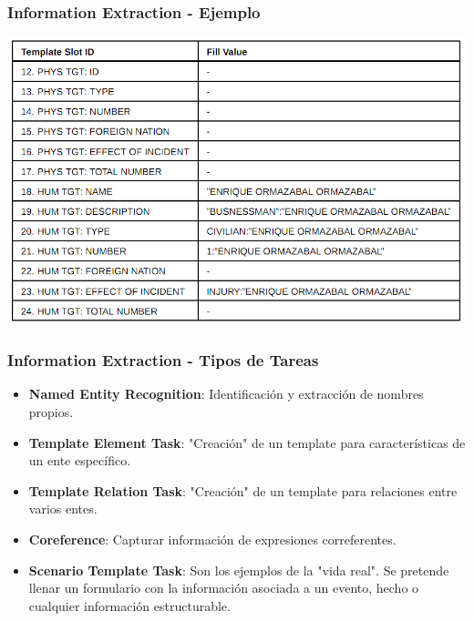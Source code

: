 \documentclass[xcolor=dvipsnames]{beamer}
\begin{document}
\begin{frame}
\frametitle{Information Extraction - Ejemplo}
\begin{center}
 \includegraphics[scale=0.3]{template2.png}
\end{center}
\end{frame}

\begin{frame}
\frametitle{Information Extraction - Tipos de Tareas}
\begin{itemize}
 \item \textbf{Named Entity Recognition}: Identificación y extracción de nombres propios.
 \item \textbf{Template Element Task}: "Creación" de un template para características de un ente específico.
 \item \textbf{Template Relation Task}: "Creación" de un template para relaciones entre varios entes.
 \item \textbf{Coreference}: Capturar información de expresiones correferentes.
 \item \textbf{Scenario Template Task}: Son los ejemplos de la "vida real". Se pretende llenar un formulario con la información asociada a un evento, hecho o cualquier información estructurable.
\end{itemize}
\end{frame}
\end{document}
